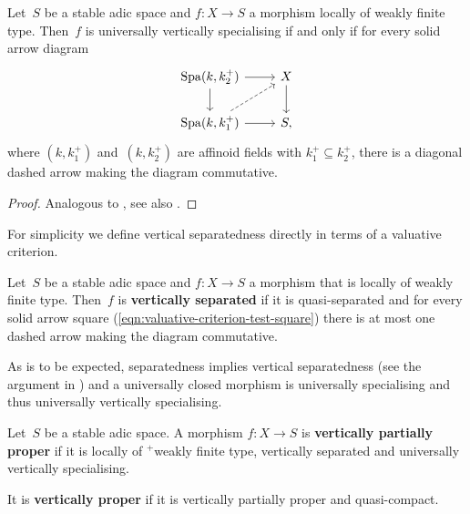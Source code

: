 \begin{lem} \label{valuative-criterion-separatednes}
    Let~$S$ be a stable adic space and $f \colon  X \to S$ a morphism locally of weakly finite type.
    Then~$f$ is universally vertically specialising if and only if for every solid arrow diagram 
    \begin{equation} \label{eqn:valuative-criterion-test-square} 
        \begin{tikzcd}
            \Spa(k, k_2^+) \ar[r] \ar[d] & X \ar[d] \\
            \Spa(k, k_1^+) \ar[r] \ar[ur,dashed] & S,
        \end{tikzcd}
    \end{equation}
    where $(k,k_1^+)$ and~$(k,k_2^+)$ are affinoid fields with $k_1^+ \subseteq k_2^+$, there is a diagonal dashed arrow making the diagram commutative.
\end{lem}

\begin{proof}
    Analogous to \cite[Proposition~1.3.8]{HuberBook}, see also \cite[Remark~3.5]{Solodov-vertical-compactification}. 
\end{proof}

For simplicity we define vertical separatedness directly in terms of a valuative criterion.

\begin{defi}
    Let~$S$ be a stable adic space and $f \colon  X \to S$ a morphism that is locally of weakly finite type.
    Then~$f$ is {\bf vertically separated} if it is quasi-separated and for every solid arrow square (\ref{eqn:valuative-criterion-test-square}) there is at most one dashed arrow making the diagram commutative.
\end{defi}

As is to be expected, separatedness implies vertical separatedness (see the argument in \cite[Proposition~1.3.8]{HuberBook}) and a universally closed morphism is universally specialising and thus universally vertically specialising.

\begin{defi}
    Let~$S$ be a stable adic space.
    A morphism $f \colon  X \to S$ is {\bf vertically partially proper} if it is locally of ${}^+$weakly finite type, vertically separated and universally vertically specialising.

    It is {\bf vertically proper} if it is vertically partially proper and quasi-compact.
\end{defi}

